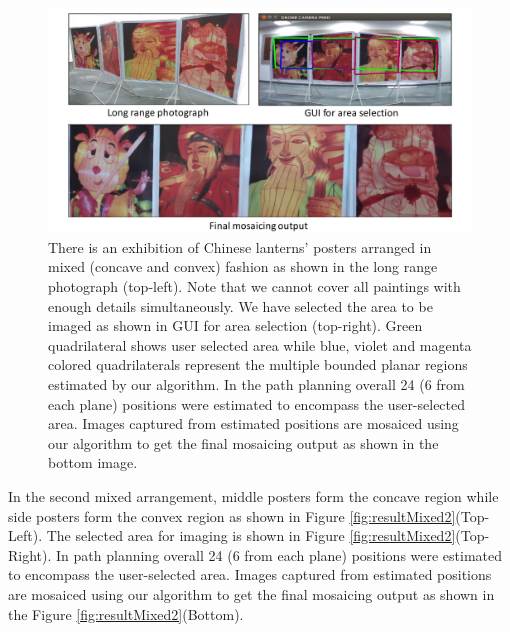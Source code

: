 \begin{figure}[t!]
\centering
\includegraphics[width=\linewidth]{figures/multiplanar/mixed1Result.pdf}
\caption[Result: Mixed arrangement]{There is an exhibition of Chinese lanterns'
posters arranged in mixed (concave and convex) fashion as shown in the long range photograph
(top-left). Note that we cannot cover all paintings with enough details
simultaneously. We have selected the area to be imaged as shown in GUI for
area selection (top-right). Green quadrilateral shows user selected area while
blue, violet and magenta colored quadrilaterals represent the multiple
bounded planar regions estimated by our algorithm. In the path planning overall
24 (6 from each plane) positions were estimated to encompass the user-selected
area. Images captured from estimated positions are mosaiced using our algorithm to get the
final mosaicing output as shown in the bottom image.}
\label{fig:resultMixed1}
\end{figure}

In the second mixed arrangement, middle posters form the concave region while
 side posters form the convex region as shown in Figure
\ref{fig:resultMixed2}(Top-Left). The selected area for imaging is shown in
Figure \ref{fig:resultMixed2}(Top-Right).  In path planning overall 24 (6 from
each plane) positions were estimated to encompass the user-selected area.
Images captured from estimated positions are mosaiced using our algorithm to get the final mosaicing
output as shown in the Figure \ref{fig:resultMixed2}(Bottom).

